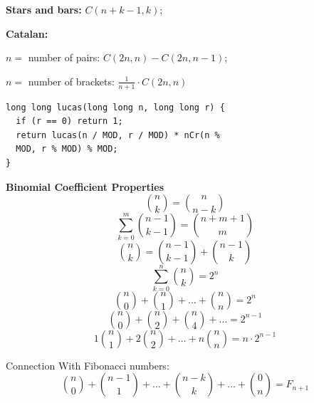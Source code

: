 \textbf{Stars and bars:} $C(n + k - 1, k)$;

\textbf{Catalan:}

$n=$ number of pairs: $C(2n, n) - C(2n, n-1)$;

$n=$ number of brackets: $\frac{1}{n+1} \cdot C(2n, n)$

\begin{lstlisting}
long long lucas(long long n, long long r) {
  if (r == 0) return 1;
  return lucas(n / MOD, r / MOD) * nCr(n %
  MOD, r % MOD) % MOD;
}
\end{lstlisting}

\textbf{Binomial Coefficient Properties}
\[
\binom{n}{k} = \binom{n}{n-k}
\]
\[
\sum_{k=0}^{m} \binom{n-1}{k-1} = \binom{n+m+1}{m}
\]
\[
\binom{n}{k} = \binom{n-1}{k-1} + \binom{n-1}{k}
\]
\[
\sum_{k=0}^{n} \binom{n}{k} = 2^n
\]
\[
\binom{n}{0} + \binom{n}{1} + \ldots + \binom{n}{n} = 2^n
\]
\[
\binom{n}{0} + \binom{n}{2} + \binom{n}{4} + \ldots = 2^{n-1}
\]
\[
1\binom{n}{1} + 2\binom{n}{2} + \ldots + n\binom{n}{n} = n \cdot 2^{n-1}
\]

Connection With Fibonacci numbers:
\[
\binom{n}{0} + \binom{n-1}{1} + \ldots + \binom{n-k}{k} + \ldots + \binom{0}{n} = F_{n+1}
\]

